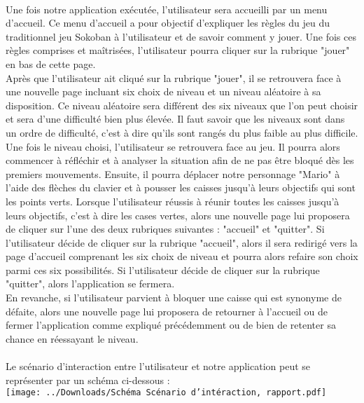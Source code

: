 \documentclass{article}
\begin{document}
\paragraph{} Une fois notre application exécutée, l'utilisateur sera accueilli par un menu d'accueil. Ce menu d'accueil a pour objectif d'expliquer les règles du jeu du traditionnel jeu Sokoban à l'utilisateur et de savoir comment y jouer. Une fois ces règles comprises et maîtrisées, l'utilisateur pourra cliquer sur la rubrique "jouer" en bas de cette page. 
\\
Après que l'utilisateur ait cliqué sur la rubrique "jouer", il se retrouvera face à une nouvelle page incluant six choix de niveau et un niveau aléatoire à sa disposition. Ce niveau aléatoire sera différent des six niveaux que l'on peut choisir et sera d'une difficulté bien plus élevée. Il faut savoir que les niveaux sont dans un ordre de difficulté, c'est à dire qu'ils sont rangés du plus faible au plus difficile.  
\\
Une fois le niveau choisi, l'utilisateur se retrouvera face au jeu. Il pourra alors commencer à réfléchir et à analyser la situation afin de ne pas être bloqué dès les premiers mouvements. Ensuite, il pourra déplacer notre personnage "Mario" à l'aide des flèches du clavier et à pousser les caisses jusqu'à leurs objectifs qui sont les points verts. 
Lorsque l'utilisateur réussis à réunir toutes les caisses jusqu'à leurs objectifs, c'est à dire les cases vertes, alors une nouvelle page lui proposera de cliquer sur l'une des deux rubriques suivantes : "accueil" et "quitter". Si l'utilisateur décide de cliquer sur la rubrique "accueil", alors il sera redirigé vers la page d'accueil comprenant les six choix de niveau et pourra alors refaire son choix parmi ces six possibilités. Si l'utilisateur décide de cliquer sur la rubrique "quitter", alors l'application se fermera.
\\
En revanche, si l'utilisateur parvient à bloquer une caisse qui est synonyme de défaite, alors une nouvelle page lui proposera de retourner à l'accueil ou de fermer l'application comme expliqué précédemment ou de bien de retenter sa chance en réessayant le niveau.  
\paragraph{} Le scénario d'interaction entre l'utilisateur et notre application peut se représenter par un schéma ci-dessous : 
\\ 
\texttt{[image: ../Downloads/Schéma Scénario d'intéraction, rapport.pdf]} 
     
\end{document}
